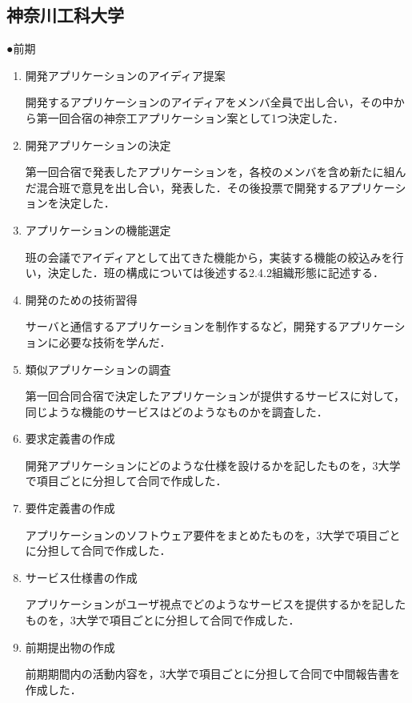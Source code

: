 \subsection{神奈川工科大学}
\par ●前期
\begin{enumerate}
\item 開発アプリケーションのアイディア提案
\par 開発するアプリケーションのアイディアをメンバ全員で出し合い，その中から第一回合宿の神奈工アプリケーション案として1つ決定した．
\item 開発アプリケーションの決定
\par 第一回合宿で発表したアプリケーションを，各校のメンバを含め新たに組んだ混合班で意見を出し合い，発表した．その後投票で開発するアプリケーションを決定した．
\item アプリケーションの機能選定
\par 班の会議でアイディアとして出てきた機能から，実装する機能の絞込みを行い，決定した．班の構成については後述する2.4.2組織形態に記述する．
\item 開発のための技術習得
\par サーバと通信するアプリケーションを制作するなど，開発するアプリケーションに必要な技術を学んだ．
\item 類似アプリケーションの調査
\par 第一回合同合宿で決定したアプリケーションが提供するサービスに対して，同じような機能のサービスはどのようなものかを調査した．
\item 要求定義書の作成
\par 開発アプリケーションにどのような仕様を設けるかを記したものを，3大学で項目ごとに分担して合同で作成した．
\item 要件定義書の作成
\par アプリケーションのソフトウェア要件をまとめたものを，3大学で項目ごとに分担して合同で作成した．
\item サービス仕様書の作成
\par アプリケーションがユーザ視点でどのようなサービスを提供するかを記したものを，3大学で項目ごとに分担して合同で作成した．
\item 前期提出物の作成
\par 前期期間内の活動内容を，3大学で項目ごとに分担して合同で中間報告書を作成した．
\end{enumerate}

